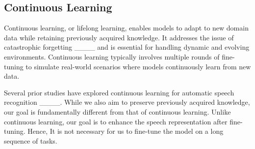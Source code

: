 \subsection{Continuous Learning}
Continuous learning, or lifelong learning, enables models to adapt to new domain data while retaining previously acquired knowledge. It addresses the issue of catastrophic forgetting ____ and is essential for handling dynamic and evolving environments. Continuous learning typically involves multiple rounds of fine-tuning to simulate real-world scenarios where models continuously learn from new data.

Several prior studies have explored continuous learning for automatic speech recognition ____.
While we also aim to preserve previously acquired knowledge, 
our goal is fundamentally different from that of continuous learning. Unlike continuous learning, our goal is to enhance the speech representation after fine-tuning. Hence, It is not necessary for us to fine-tune the model on a long sequence of tasks.